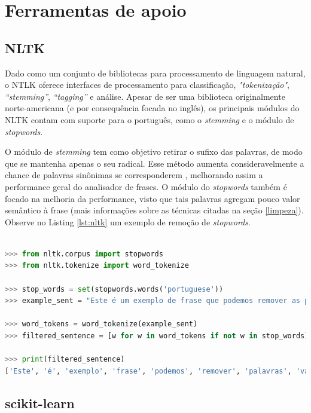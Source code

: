 \chapter[Ferramentas de apoio]{Ferramentas de apoio}

\section{NLTK}

Dado como um conjunto de bibliotecas para processamento de linguagem natural, o NTLK oferece interfaces de processamento para classificação, \textit{"tokenização"}, \textit{“stemming”}, \textit{“tagging”} e análise. Apesar de ser uma biblioteca originalmente norte-americana (e por consequência focada no inglês), os principais módulos do NLTK contam com suporte para o português, como o \textit{stemming} e o módulo de \textit{stopwords}.

O módulo de \textit{stemming} tem como objetivo retirar o sufixo das palavras, de modo que se mantenha apenas o seu radical. Esse método aumenta consideravelmente a chance de palavras sinônimas se corresponderem \cite{marconltk}, melhorando assim a performance geral do analisador de frases. O módulo do \textit{stopwords} também é focado na melhoria da performance, visto que tais palavras agregam pouco valor semântico à frase (mais informações sobre as técnicas citadas na seção \ref{limpeza}). Observe no Listing \ref{lst:nltk} um exemplo de remoção de \textit{stopwords}.

\begin{lstlisting}[language=python, caption=Removendo \textit{stopwords} usando a biblioteca NLTK, label={lst:nltk}]

>>> from nltk.corpus import stopwords 
>>> from nltk.tokenize import word_tokenize 

>>> stop_words = set(stopwords.words('portuguese')) 
>>> example_sent = "Este é um exemplo de frase que podemos remover as palavras vazias"

>>> word_tokens = word_tokenize(example_sent)
>>> filtered_sentence = [w for w in word_tokens if not w in stop_words]

>>> print(filtered_sentence)
['Este', 'é', 'exemplo', 'frase', 'podemos', 'remover', 'palavras', 'vazias', '.']


\end{lstlisting}

\section{scikit-learn}
\label{sec:sklearn}

